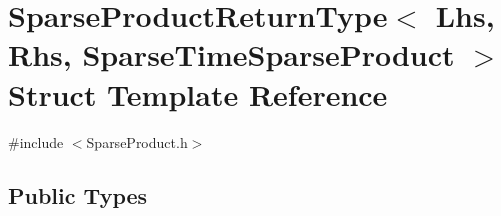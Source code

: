 \hypertarget{struct_sparse_product_return_type_3_01_lhs_00_01_rhs_00_01_sparse_time_sparse_product_01_4}{\section{Sparse\-Product\-Return\-Type$<$ Lhs, Rhs, Sparse\-Time\-Sparse\-Product $>$ Struct Template Reference}
\label{struct_sparse_product_return_type_3_01_lhs_00_01_rhs_00_01_sparse_time_sparse_product_01_4}
}


{\ttfamily \#include $<$Sparse\-Product.\-h$>$}

\subsection*{Public Types}
